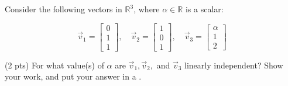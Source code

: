\documentclass[twoside,12pt]{article}
\begin{document}
\begin{probset}
\begin{prob}
\begin{subprobset}
\begin{subprob}





            
        \end{subprob}
        
    \end{subprobset}
    
\end{prob}


\newpage \begin{prob}

Consider the following vectors in \( \mathbb{R}^3 \), where $\alpha \in \mathbb{R}$ is a scalar:

\[
\vec{v}_1 = \begin{bmatrix} 0 \\ 1 \\ 1 \end{bmatrix}, \quad 
\vec{v}_2 = \begin{bmatrix} 1 \\ 0 \\ 1 \end{bmatrix}, \quad 
\vec{v}_3 = \begin{bmatrix} \alpha \\ 1 \\ 2 \end{bmatrix}
\]

\begin{subprobset}        
    \begin{subprob}(2 pts)
        For what value(s) of $\alpha$ are $\vec{v}_1, \vec{v}_2,$ and $\vec{v}_3$ linearly independent? Show your work, and put your answer in a . 

\begin{responsebox}{1.32in}


\end{responsebox}
\end{subprob}
\end{subprobset}
\end{prob}
\end{probset}
\end{document}
